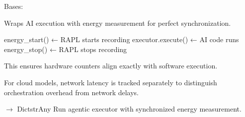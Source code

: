 \documentclass[letterpaper,10pt,english]{sphinxmanual}
\begin{document}
\begin{fulllineitems}
\label{\detokenize{core.execution.harness:core.execution.harness.ExperimentHarness}}
\pysigstartsignatures
\pysiglinewithargsret
{}
{}
{}
\pysigstopsignatures
\sphinxAtStartPar
Bases: 

\sphinxAtStartPar
Wraps AI execution with energy measurement for perfect synchronization.
\begin{description}
\sphinxAtStartPar
energy\_start()  ← RAPL starts recording
executor.execute()  ← AI code runs
energy\_stop()   ← RAPL stops recording

\end{description}

\sphinxAtStartPar
This ensures hardware counters align exactly with software execution.

\sphinxAtStartPar
For cloud models, network latency is tracked separately to distinguish
orchestration overhead from network delays.

\begin{fulllineitems}
\label{\detokenize{core.execution.harness:core.execution.harness.ExperimentHarness.run_agentic}}
\pysigstartsignatures
\pysiglinewithargsret
{}
{\sphinxparamcomma {}\sphinxparamcomma {}\sphinxparamcomma {}\sphinxparamcomma {}\sphinxparamcomma {}}
{{ $\rightarrow$ Dict\DUrole{p}{{[}}strAny\DUrole{p}{{]}}}}
\pysigstopsignatures
\sphinxAtStartPar
Run agentic executor with synchronized energy measurement.


\end{fulllineitems}
\end{fulllineitems}
\end{document}
